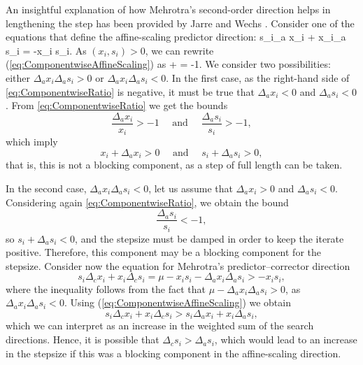 An insightful explanation of how Mehrotra's second-order direction
helps in lengthening the step has been provided by
Jarre and Wechs \cite{JarreWechs}.
Consider one of the equations that define the affine-scaling
predictor direction:
\be  \label{eq:ComponentwiseAffineScaling}
  s_i\Delta_a x_i + x_i\Delta_a s_i = -x_i s_i.
\ee
As $(x_i, s_i) > 0$, we can rewrite (\ref{eq:ComponentwiseAffineScaling}) as
\be  \label{eq:ComponentwiseRatio}
   +  = -1.
\ee
We consider two possibilities: either $\Delta_a x_i \Delta_a s_i > 0$
or $\Delta_a x_i \Delta_a s_i < 0$. In the first case, as the right-hand side
of \eqref{eq:ComponentwiseRatio} is negative, it must be true
that $\Delta_a x_i < 0$ and $\Delta_a s_i < 0$.
From \eqref{eq:ComponentwiseRatio} we get the bounds
\[
  \frac{\Delta_a x_i}{x_i} > -1 \quad \text{ and } \quad
  \frac{\Delta_a s_i}{s_i} > -1,
\]
which imply
\[
  x_i + \Delta_a x_i > 0 \quad \text{ and } \quad s_i + \Delta_a s_i > 0,
\]
that is, this is not a blocking component, as a step of full length
can be taken.

In the second case, $\Delta_a x_i \Delta_a s_i < 0$, let us assume that 
$\Delta_a x_i > 0$ and $\Delta_a s_i < 0$. 
Considering again \eqref{eq:ComponentwiseRatio}, we obtain the bound
\[
  \frac{\Delta_a s_i}{s_i} < -1,
\]
so
$s_i + \Delta_a s_i < 0$, and the stepsize must be damped
in order to keep the iterate positive. Therefore,
this component may be a blocking component for the stepsize.
Consider now the equation for Mehrotra's predictor--corrector
direction
\[
  s_i\Delta_c x_i + x_i\Delta_c s_i = \mu -x_i s_i -\Delta_a x_i\Delta_a s_i 
                                    > -x_i s_i,
\]
where the inequality follows from the fact that
$\mu - \Delta_a x_i \Delta_a s_i > 0$, as
$\Delta_a x_i \Delta_a s_i < 0$.
Using (\ref{eq:ComponentwiseAffineScaling}) we obtain
\[
  s_i\Delta_c x_i + x_i\Delta_c s_i > s_i\Delta_a x_i + x_i\Delta_a s_i,
\]
which we can interpret as an increase in the weighted sum 
of the search directions. Hence, it is possible that 
$\Delta_c s_i > \Delta_a s_i$, which would lead to an increase in
the stepsize if this was a blocking component in the 
affine-scaling direction.

